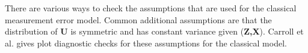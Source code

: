 \documentclass[11pt]{article}\usepackage[]{graphicx}\usepackage[]{color}
\begin{document}
There are various ways to check the assumptions that are used for the classical measurement error model. Common additional assumptions are that the distribution of {\bf U} is symmetric and has constant variance given ({\bf Z,X}). Carroll et al. \cite{nonlinear} gives plot diagnostic checks for these assumptions for the classical model.  

% 

% 
% 
% 
% 
\end{document}

